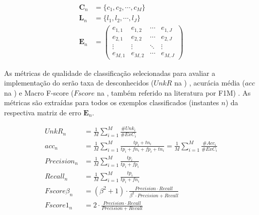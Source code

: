 \begin{align}
  \mathbf{C}_n &= \{ c_1, c_2, \cdots, c_M \}  \label{eq:classes} \\
  \mathbf{L}_n &= \{ l_1, l_2, \cdots, l_J \}  \label{eq:labels} \\
  \mathbf{E}_n &= \begin{pmatrix}
    e_{1,1} & e_{1,2} & \cdots & e_{1,J} \\
    e_{2,1} & e_{2,2} & \cdots & e_{2,J} \\
    \vdots  & \vdots  & \ddots & \vdots  \\
    e_{M,1} & e_{M,2} & \cdots & e_{M,J} 
  \end{pmatrix}  \label{eq:matrix}
\end{align}

As métricas de qualidade de classificação selecionadas para avaliar a
implementação do \mfog serão
taxa de desconhecidos ($UnkR$ na ) \cite{Faria2013},
acurácia média ($acc$ na )
e Macro F-score ($Fscore$ na , também referido na literatura por
F1M) \cite{Sokolova2009,DaSilva2018thesis}.
As métricas são extraídas para todos os exemplos classificados (instantes $n$)
da respectiva matriz de erro $\mathbf{E}_n$.



\begin{align}
  \mathit{UnkR}_n       &= \frac{1}{M} \sum_{i=1}^{M} \frac{\#Unk_i}{\#ExC_i} \label{eq:unkr} \\
  \mathit{acc}_n        &= \frac{1}{M} \sum_{i=1}^{M} \frac{tp_i + tn_i}{tp_i+fn_i+fp_i+tn_i}
  = \frac{1}{M} \sum_{i=1}^{M} \frac{\#Acc_i}{\#ExC_i}  \label{eq:acc} \\
  \mathit{Precision}_n  &= \frac{1}{M} \sum_{i=1}^{M} \frac{tp_i}{tp_i+fp_i} \\
  \mathit{Recall}_n     &= \frac{1}{M} \sum_{i=1}^{M} \frac{tp_i}{tp_i+fn_i} \\
  \mathit{Fscore}\beta_n &= (\beta^2 +1) \cdot
  \frac{
  \mathit{Precision} \cdot \mathit{Recall}
  }{
    \beta^2 \cdot \mathit{Precision} +\mathit{Recall}
  }\\
  \mathit{Fscore}1_n   &= 2 \cdot \frac{
    \mathit{Precision} \cdot \mathit{Recall}
    }{
      \mathit{Precision} +\mathit{Recall}
    } \label{eq:fscore}
\end{align}

